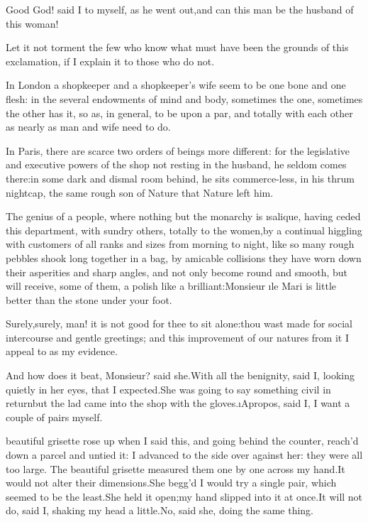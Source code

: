 \documentclass[twoside]{article}
\begin{document}
Good God! said I to myself, as he went out,\tsk and can this man be the
husband of this woman!

Let it not torment the few who know what must have been the grounds of
this exclamation, if I explain it to those who do not.

In London a shopkeeper and a shopkeeper’s wife seem to be one bone and
one flesh: in the several endowments of mind and body, sometimes the one,
sometimes the other has it, so as, in general, to be upon a par, and
totally with each other as nearly as man and wife need to do.

In Paris, there are scarce two orders of beings more different: for the
legislative and executive powers of the shop not resting in the husband,
he seldom comes there:\tsk in some dark and dismal room behind, he sits
commerce-less, in his thrum nightcap, the same rough son of Nature that
Nature left him.

The genius of a people, where nothing but the monarchy is \i{salique},
having ceded this department, with sundry others, totally to the
women,\tsk by a continual higgling with customers of all ranks and sizes from
morning to night, like so many rough pebbles shook long together in a
bag, by amicable collisions they have worn down their asperities and
sharp angles, and not only become round and smooth, but will receive,
some of them, a polish like a brilliant:\tsk Monsieur \i{le Mari} is little
better than the stone under your foot.

\tsk Surely,\tsk surely, man! it is not good for thee to sit alone:\tsk thou wast
made for social intercourse and gentle greetings; and this improvement of
our natures from it I appeal to as my evidence.

\tsk And how does it beat, Monsieur? said she.\tsk With all the benignity, said
I, looking quietly in her eyes, that I expected.\tsk She was going to say
something civil in return\tsk but the lad came into the shop with the
gloves.\tsk \i{Apropos}, said I, I want a couple of pairs myself.






 beautiful grisette rose up when I said this, and going behind the
counter, reach’d down a parcel and untied it: I advanced to the side over
against her: they were all too large.  The beautiful grisette measured
them one by one across my hand.\tsk It would not alter their dimensions.\tsk She
begg’d I would try a single pair, which seemed to be the least.\tsk She held
it open;\tsk my hand slipped into it at once.\tsk It will not do, said I, shaking
my head a little.\tsk No, said she, doing the same thing.
\end{document}
